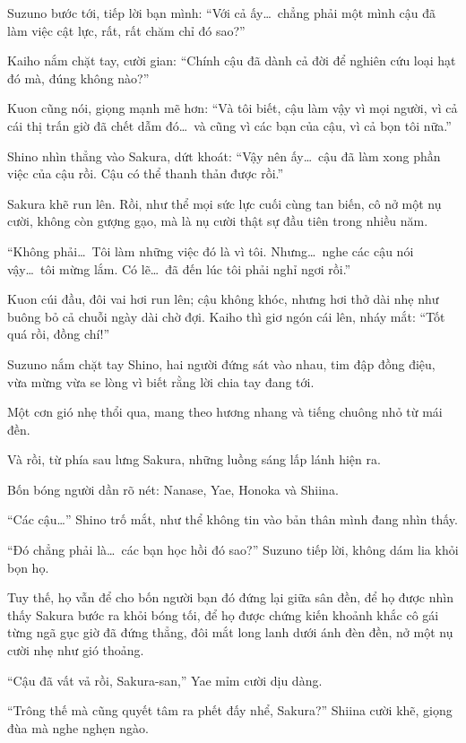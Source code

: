 \documentclass[../main.tex]{subfiles}
\begin{document}
Suzuno bước tới, tiếp lời bạn mình: ``Với cả ấy\dots\ chẳng phải một mình cậu đã làm việc cật lực, rất, rất chăm chỉ đó sao?''

Kaiho nắm chặt tay, cười gian: ``Chính cậu đã dành cả đời để nghiên cứu loại hạt đó mà, đúng không nào?''

Kuon cũng nói, giọng mạnh mẽ hơn: ``Và tôi biết, cậu làm vậy vì mọi người, vì cả cái thị trấn giờ đã chết dẫm đó\dots\ và cũng vì các bạn của cậu, vì cả bọn tôi nữa.''

Shino nhìn thẳng vào Sakura, dứt khoát: ``Vậy nên ấy\dots\ cậu đã làm xong phần việc của cậu rồi. Cậu có thể thanh thản được rồi.''

Sakura khẽ run lên. Rồi, như thể mọi sức lực cuối cùng tan biến, cô nở một nụ cười, không còn gượng gạo, mà là nụ cười thật sự đầu tiên trong nhiều năm.

``Không phải\dots\ Tôi làm những việc đó là vì tôi. Nhưng\dots\ nghe các cậu nói vậy\dots\ tôi mừng lắm. Có lẽ\dots\ đã đến lúc tôi phải nghỉ ngơi rồi.''

Kuon cúi đầu, đôi vai hơi run lên; cậu không khóc, nhưng hơi thở dài nhẹ như buông bỏ cả chuỗi ngày dài chờ đợi. Kaiho thì giơ ngón cái lên, nháy mắt: ``Tốt quá rồi, đồng chí!''

Suzuno nắm chặt tay Shino, hai người đứng sát vào nhau, tim đập đồng điệu, vừa mừng vừa se lòng vì biết rằng lời chia tay đang tới.

Một cơn gió nhẹ thổi qua, mang theo hương nhang và tiếng chuông nhỏ từ mái đền.

Và rồi, từ phía sau lưng Sakura, những luồng sáng lấp lánh hiện ra.

Bốn bóng người dần rõ nét: Nanase, Yae, Honoka và Shiina.


``Các cậu\dots'' Shino trố mắt, như thể không tin vào bản thân mình đang nhìn thấy.

``Đó chẳng phải là\dots\ các bạn học hồi đó sao?'' Suzuno tiếp lời, không dám lia khỏi bọn họ.

Tuy thế, họ vẫn để cho bốn người bạn đó đứng lại giữa sân đền, để họ được nhìn thấy Sakura bước ra khỏi bóng tối, để họ được chứng kiến khoảnh khắc cô gái từng ngã gục giờ đã đứng thẳng, đôi mắt long lanh dưới ánh đèn đền, nở một nụ cười nhẹ như gió thoảng.

``Cậu đã vất vả rồi, Sakura-san,'' Yae mỉm cười dịu dàng.

``Trông thế mà cũng quyết tâm ra phết đấy nhể, Sakura?'' Shiina cười khẽ, giọng đùa mà nghe nghẹn ngào.
\end{document}
